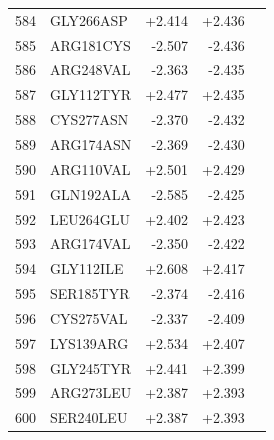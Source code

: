 \begin{longtable}{r l r r c}
584 & GLY266ASP & +2.414 & +2.436 &  \\
585 & ARG181CYS & -2.507 & -2.436 &  \\
586 & ARG248VAL & -2.363 & -2.435 &  \\
587 & GLY112TYR & +2.477 & +2.435 &  \\
588 & CYS277ASN & -2.370 & -2.432 &  \\
589 & ARG174ASN & -2.369 & -2.430 &  \\
590 & ARG110VAL & +2.501 & +2.429 &  \\
591 & GLN192ALA & -2.585 & -2.425 &  \\
592 & LEU264GLU & +2.402 & +2.423 &  \\
593 & ARG174VAL & -2.350 & -2.422 &  \\
594 & GLY112ILE & +2.608 & +2.417 &  \\
595 & SER185TYR & -2.374 & -2.416 &  \\
596 & CYS275VAL & -2.337 & -2.409 &  \\
597 & LYS139ARG & +2.534 & +2.407 &  \\
598 & GLY245TYR & +2.441 & +2.399 &  \\
599 & ARG273LEU & +2.387 & +2.393 &  \\
600 & SER240LEU & +2.387 & +2.393 &  \\
\hline
\end{longtable}\normalsize
